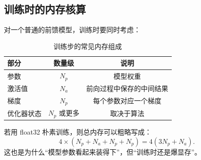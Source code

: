 \subsection{训练时的内存核算}

对一个普通的前馈模型，训练时要同时考虑：

\begin{table}[H]
\centering
\begin{tabular}{lcc}
\toprule
\textbf{部分} & \textbf{数量级} & \textbf{说明} \\
\midrule
参数 & \(N_p\) & 模型权重 \\
激活值 & \(N_a\) & 前向过程中保存的中间结果 \\
梯度 & \(N_p\) & 每个参数对应一个梯度 \\
优化器状态 & \(N_p\) 或更多 & 取决于算法 \\
\bottomrule
\end{tabular}
\caption{训练步的常见内存组成}
\end{table}

若用 float32 朴素训练，则总内存可以粗略写成：
\[
4 \times (N_p + N_a + N_p + N_p) = 4(3N_p + N_a).
\]
这也是为什么“模型参数看起来装得下”，但“训练时还是爆显存”。

